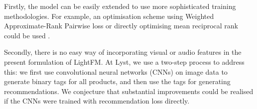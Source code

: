 \documentclass{sig-alternate}
\providecommand\authInstitution{Lyst}
\begin{document}
Firstly, the model can be easily extended to use more sophisticated training methodologies. For example, an optimisation scheme using Weighted Approximate-Rank Pairwise loss \cite{weston2011wsabie} or directly optimising mean reciprocal rank could be used \cite{shi2012climf}.

Secondly, there is no easy way of incorporating visual or audio features in the present formulation of LightFM. At \authInstitution, we use a two-step process to address this: we first use convolutional neural networks (CNNs) on image data to generate binary tags for all products, and then use the tags for generating recommendations. We conjecture that substantial improvements could be realised if the CNNs were trained with recommendation loss directly.




%

%
%
\end{document}
